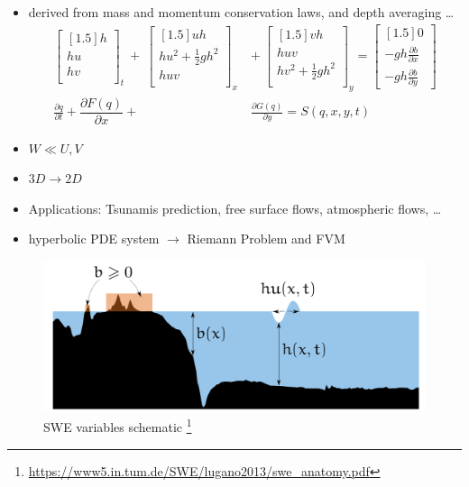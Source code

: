 \begin{frame}
    
\begin{multicols}{2}
    \begin{itemize}
\item derived from mass and momentum conservation laws, and depth averaging \dots %
\vspace{0.5cm}
\begin{align*}
\begin{bmatrix}[1.5]
h\\
hu\\
hv\\
\end{bmatrix}_t \ + \ 
\begin{bmatrix}[1.5]
uh\\
hu^2 + \frac{1}{2}gh^2\\
huv\\
\end{bmatrix}_x\ &+ \ 
\begin{bmatrix}[1.5]
vh\\
huv\\
hv^2 + \frac{1}{2}gh^2\\
\end{bmatrix}_y = 
\begin{bmatrix}[1.5]
0\\
-gh\frac{\partial b}{\partial x}\\
-gh\frac{\partial b}{\partial y}
\end{bmatrix}\\[0.75cm]
\frac{\partial q}{\partial t} + \dfrac{\partial F(q)}{\partial x} + &\frac{\partial G(q)}{\partial y} = S(q,x,y,t) 
\end{align*}
\item $ W \ll U,V $
\item $3D\rightarrow 2D$ 
\item Applications: {\small Tsunamis prediction, free surface flows, atmospheric flows, \dots} 
\item hyperbolic PDE system $\rightarrow$ Riemann Problem and FVM
\end{itemize}
    \vfill\columnbreak
    \vspace*{0.39cm}
    \begin{figure}
        \includegraphics[width=\columnwidth, height=.4\textheight]{./Resources/Images/swe.png}%
    \caption{SWE variables schematic \footnote{\url{https://www5.in.tum.de/SWE/lugano2013/swe_anatomy.pdf}}}
    \end{figure}


\end{multicols}
\end{frame}
